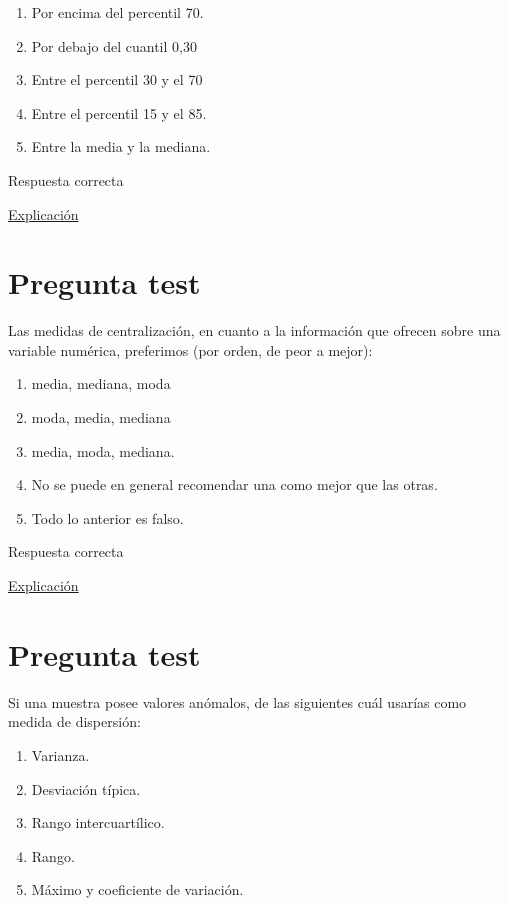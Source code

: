 \documentclass[
]{book}
\providecommand{\tightlist}{%
  \setlength{\itemsep}{0pt}\setlength{\parskip}{0pt}}
\begin{document}
\begin{enumerate}
\def\labelenumi{\alph{enumi})}
\tightlist
\item
  Por encima del percentil 70.
\item
  Por debajo del cuantil 0,30
\item
  Entre el percentil 30 y el 70
\item
  Entre el percentil 15 y el 85.
\item
  Entre la media y la mediana.
\end{enumerate}

Respuesta correcta

\href{https://1fjmanzano.github.io/bioestadistica/distribuciones-de-probabilidad.html\#distribucio\%CC\%81n-normal}{Explicación}

\hypertarget{pregunta-test-63}{%
\section{Pregunta test}\label{pregunta-test-63}}

Las medidas de centralización, en cuanto a la información que ofrecen sobre una variable numérica, preferimos (por orden, de peor a mejor):

\begin{enumerate}
\def\labelenumi{\alph{enumi})}
\tightlist
\item
  media, mediana, moda
\item
  moda, media, mediana
\item
  media, moda, mediana.
\item
  No se puede en general recomendar una como mejor que las otras.
\item
  Todo lo anterior es falso.
\end{enumerate}

Respuesta correcta

\href{https://1fjmanzano.github.io/bioestadistica/medidas-de-posicio\%CC\%81n-dispersio\%CC\%81n-y-forma.html\#medidas-de-posicio\%CC\%81n-centrales}{Explicación}

\hypertarget{pregunta-test-64}{%
\section{Pregunta test}\label{pregunta-test-64}}

Si una muestra posee valores anómalos, de las siguientes cuál usarías como medida de dispersión:

\begin{enumerate}
\def\labelenumi{\alph{enumi})}
\tightlist
\item
  Varianza.
\item
  Desviación típica.
\item
  Rango intercuartílico.
\item
  Rango.
\item
  Máximo y coeficiente de variación.
\end{enumerate}
\end{document}
